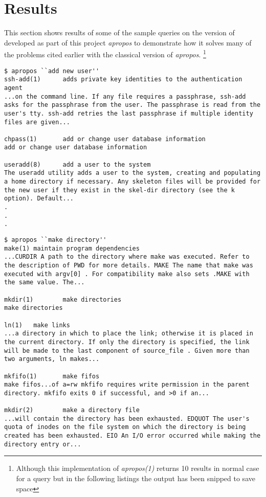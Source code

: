 \documentclass[titlepage, a4paper, 12pt]{article}
\begin{document}
\section{Results}
This section shows results of some of the sample queries on the version of
developed as part of this project
\textit{apropos} to demonstrate how it solves many of the problems cited earlier
with the classical version of \textit{apropos}.
\footnote{Although this implementation of \textit{apropos(1)} returns 10 results
in normal case for a query but in the following listings the output has been
snipped to save space
}
\begin{lstlisting}
$ apropos ``add new user''
ssh-add(1)      adds private key identities to the authentication agent
...on the command line. If any file requires a passphrase, ssh-add
asks for the passphrase from the user. The passphrase is read from the
user's tty. ssh-add retries the last passphrase if multiple identity
files are given...

chpass(1)       add or change user database information
add or change user database information

useradd(8)      add a user to the system
The useradd utility adds a user to the system, creating and populating
a home directory if necessary. Any skeleton files will be provided for
the new user if they exist in the skel-dir directory (see the k
option). Default...
.
.
.
\end{lstlisting}
\begin{lstlisting}
$ apropos ``make directory''
make(1) maintain program dependencies
...CURDIR A path to the directory where make was executed. Refer to
the description of PWD for more details. MAKE The name that make was
executed with argv[0] . For compatibility make also sets .MAKE with
the same value. The...

mkdir(1)        make directories
make directories

ln(1)   make links
...a directory in which to place the link; otherwise it is placed in
the current directory. If only the directory is specified, the link
will be made to the last component of source_file . Given more than
two arguments, ln makes...

mkfifo(1)       make fifos
make fifos...of a=rw mkfifo requires write permission in the parent
directory. mkfifo exits 0 if successful, and >0 if an...

mkdir(2)        make a directory file
...will contain the directory has been exhausted. EDQUOT The user's
quota of inodes on the file system on which the directory is being
created has been exhausted. EIO An I/O error occurred while making the
directory entry or...
\end{lstlisting}
\end{document}
